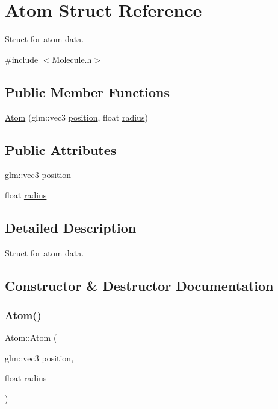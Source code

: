 \hypertarget{struct_atom}{}\section{Atom Struct Reference}
\label{struct_atom}


Struct for atom data.  




{\ttfamily \#include $<$Molecule.\+h$>$}

\subsection*{Public Member Functions}
\begin{DoxyCompactItemize}
\item 
\mbox{\hyperlink{struct_atom_acad29821d9397b4eba5ec9a43b1999df}{Atom}} (glm\+::vec3 \mbox{\hyperlink{struct_atom_a6203936c817773d74620f4644d8551fc}{position}}, float \mbox{\hyperlink{struct_atom_abe2d6ad2594dac70d88ec2cfdb73c8e9}{radius}})
\end{DoxyCompactItemize}
\subsection*{Public Attributes}
\begin{DoxyCompactItemize}
\item 
glm\+::vec3 \mbox{\hyperlink{struct_atom_a6203936c817773d74620f4644d8551fc}{position}}
\item 
float \mbox{\hyperlink{struct_atom_abe2d6ad2594dac70d88ec2cfdb73c8e9}{radius}}
\end{DoxyCompactItemize}


\subsection{Detailed Description}
Struct for atom data. 



\subsection{Constructor \& Destructor Documentation}
\mbox{\label{struct_atom_acad29821d9397b4eba5ec9a43b1999df}} 
\subsubsection{\texorpdfstring{Atom()}{Atom()}}
{\footnotesize\ttfamily Atom\+::\+Atom (\begin{DoxyParamCaption}\item[{glm\+::vec3}]{position,  }\item[{float}]{radius }\end{DoxyParamCaption})\hspace{0.3cm}{\ttfamily [inline]}}

